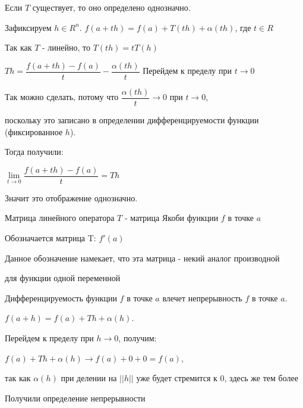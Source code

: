 \begin{remark} \thmslashn

    Если $T$ существует, то оно определено однозначно. 

    Зафиксируем $h \in R^n$. $f(a + th) = f(a) + T(th) + \alpha(th)$, где $t \in R$

    Так как $T$ - линейно, то $T(th) = t T(h)$

    $Th = \dfrac{f(a + th) - f(a)}{t} - \dfrac{\alpha(th)}{t}$ Перейдем к пределу при $t \rightarrow 0$

    Так можно сделать, потому что $\dfrac{\alpha(th)}{t} \rightarrow 0$ при $t \rightarrow 0$,

    поскольку это записано в определении дифференцируемости функции (фиксированное $h$).

    Тогда получили:

    $\lim\limits_{t\rightarrow 0} \dfrac{f(a + th) - f(a)}{t} = Th$

    Значит это отображение однозначно.
\end{remark}

\begin{definition} \thmslashn

    Матрица линейного оператора $T$ - матрица Якоби функции $f$ в точке $a$

    Обозначается матрица T: $f'(a)$

    Данное обозначение намекает, что эта матрица - некий аналог производной

    для функции одной переменной
   
\end{definition}

\begin{remark} \thmslashn

    Дифференцируемость функции $f$ в точке $a$ влечет непрерывность $f$ в точке $a$. 

    $f(a + h) = f(a) + Th + \alpha(h)$. 

    Перейдем к пределу при $h \rightarrow 0$, получим: 

    $f(a) + Th + \alpha(h) \rightarrow f(a) + 0 + 0 = f(a)$,

    так как $\alpha(h)$ при делении на $||h||$ уже будет стремится к 0, здесь же тем более

    Получили определение непрерывности

\end{remark}

